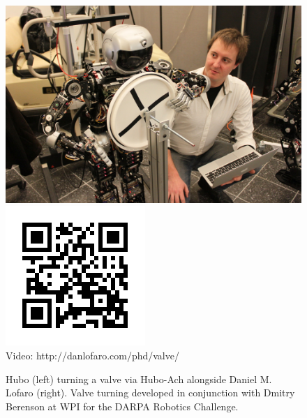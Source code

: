 \begin{figure}[thpb]
  \centering
      \includegraphics[width=0.69\columnwidth]{./pix/IMG_9107-small.jpg}
      \includegraphics[width=0.3\columnwidth]{./qrcode/qrcode-valve.png}\\
      Video: http://danlofaro.com/phd/valve/
\caption{Hubo (left) turning a valve via Hubo-Ach alongside Daniel
  M. Lofaro (right).  Valve turning developed in conjunction with
  Dmitry Berenson at WPI for the DARPA Robotics Challenge.}
  \label{fig:valve}
\end{figure}
